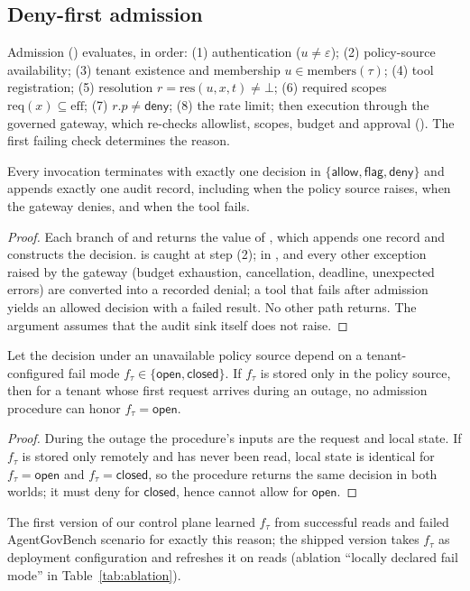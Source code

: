 \subsection{Deny-first admission}
Admission () evaluates, in order: (1) authentication ($u\neq\varepsilon$); (2) policy-source availability; (3) tenant existence and membership $u\in\mathrm{members}(\tau)$; (4) tool registration; (5) resolution $r=\mathrm{res}(u,x,t)\neq\bot$; (6) required scopes $\mathrm{req}(x)\subseteq\mathrm{eff}$; (7) $r.p\neq\mathsf{deny}$; (8) the rate limit; then execution through the governed gateway, which re-checks allowlist, scopes, budget and approval (). The first failing check determines the reason.

\begin{proposition}
\label{prop:total}
Every invocation terminates with exactly one decision in $\{\mathsf{allow},\mathsf{flag},\mathsf{deny}\}$ and appends exactly one  audit record, including when the policy source raises, when the gateway denies, and when the tool fails.
\end{proposition}
\begin{proof}
Each branch of  and  returns the value of , which appends one record and constructs the decision.  is caught at step (2); in ,  and every other exception raised by the gateway (budget exhaustion, cancellation, deadline, unexpected errors) are converted into a recorded denial; a tool that fails after admission yields an allowed decision with a failed result. No other path returns. The argument assumes that the audit sink itself does not raise.
\end{proof}

\begin{proposition}
\label{prop:failmode}
Let the decision under an unavailable policy source depend on a tenant-configured fail mode $f_\tau\in\{\mathsf{open},\mathsf{closed}\}$. If $f_\tau$ is stored only in the policy source, then for a tenant whose first request arrives during an outage, no admission procedure can honor $f_\tau=\mathsf{open}$.
\end{proposition}
\begin{proof}
During the outage the procedure's inputs are the request and local state. If $f_\tau$ is stored only remotely and has never been read, local state is identical for $f_\tau=\mathsf{open}$ and $f_\tau=\mathsf{closed}$, so the procedure returns the same decision in both worlds; it must deny for $\mathsf{closed}$, hence cannot allow for $\mathsf{open}$.
\end{proof}
The first version of our control plane learned $f_\tau$ from successful reads and failed AgentGovBench scenario  for exactly this reason; the shipped version takes $f_\tau$ as deployment configuration and refreshes it on reads (ablation ``locally declared fail mode'' in Table~\ref{tab:ablation}).

